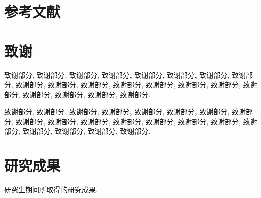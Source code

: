 \documentclass[UTF8,openright]{ctexbook}
\begin{document}
{}
\listoftables

{}
\listofalgorithms

\clearpage
\mainmatter
\linespread{1.4}\selectfont









\chapter*{参考文献}



\chapter*{致谢}

致谢部分, 致谢部分, 致谢部分, 致谢部分, 致谢部分,
致谢部分, 致谢部分, 致谢部分, 致谢部分, 致谢部分,
致谢部分, 致谢部分, 致谢部分, 致谢部分, 致谢部分,
致谢部分, 致谢部分, 致谢部分, 致谢部分, 致谢部分.

致谢部分, 致谢部分, 致谢部分, 致谢部分, 致谢部分,
致谢部分, 致谢部分, 致谢部分, 致谢部分, 致谢部分,
致谢部分, 致谢部分, 致谢部分, 致谢部分, 致谢部分,
致谢部分, 致谢部分, 致谢部分, 致谢部分, 致谢部分.

\chapter*{研究成果}

研究生期间所取得的研究成果.
\end{document}

